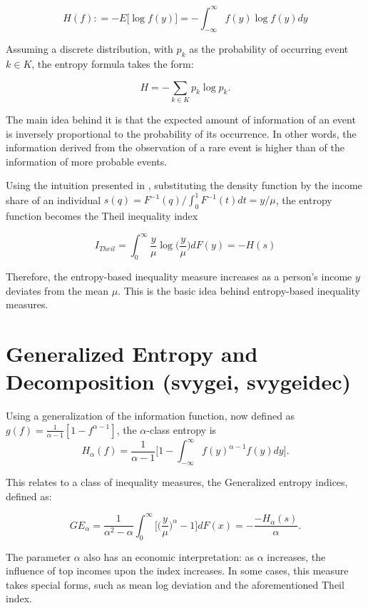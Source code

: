 \documentclass[]{book}
\begin{document}
\[
H(f) \colon = -E \big[ \log f(y) \big] = - \int_{-\infty}^{\infty} f(y) \log f(y) dy
\]

Assuming a discrete distribution, with \(p_k\) as the probability of
occurring event \(k \in K\), the entropy formula takes the form:

\[
H = - \sum_{k \in K} p_k \log p_k \text{.}
\]

The main idea behind it is that the expected amount of information of an
event is inversely proportional to the probability of its occurrence. In
other words, the information derived from the observation of a rare
event is higher than of the information of more probable events.

Using the intuition presented in \citep{cowell2009}, substituting the
density function by the income share of an individual
\(s(q) = {F}^{-1}(q) / \int_{0}^{1} F^{-1}(t)dt = y/\mu\), the entropy
function becomes the Theil inequality index

\[
I_{Theil} = \int_{0}^{\infty} \frac{y}{\mu} \log \bigg( \frac{y}{\mu} \bigg) dF(y) = -H(s)
\]

Therefore, the entropy-based inequality measure increases as a person's
income \(y\) deviates from the mean \(\mu\). This is the basic idea
behind entropy-based inequality measures.

\section{Generalized Entropy and Decomposition (svygei,
svygeidec)}\label{generalized-entropy-and-decomposition-svygei-svygeidec}

Using a generalization of the information function, now defined as
\(g(f) = \frac{1}{\alpha-1} [ 1 - f^{\alpha - 1} ]\), the
\(\alpha\)-class entropy is \[
H_\alpha(f) = \frac{1}{\alpha - 1} \bigg[ 1 - \int_{-\infty}^{\infty} f(y)^{ \alpha - 1} f(y) dy \bigg] \text{.}
\]

This relates to a class of inequality measures, the Generalized entropy
indices, defined as:

\[
GE_\alpha = \frac{1}{\alpha^2 - \alpha} \int_{0}^\infty \bigg[ \bigg( \frac{y}{\mu} \bigg)^\alpha - 1 \bigg]dF(x) = - \frac{-H_\alpha(s) }{ \alpha } \text{.}
\]

The parameter \(\alpha\) also has an economic interpretation: as
\(\alpha\) increases, the influence of top incomes upon the index
increases. In some cases, this measure takes special forms, such as mean
log deviation and the aforementioned Theil index.
\end{document}

